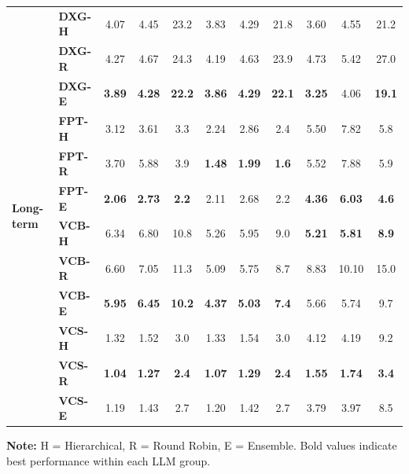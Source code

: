 \begin{table}[!h]
\begin{tabular}{llccc|ccc|ccc}
\multirow{12}{*}{\textbf{Long-term}}
& \textbf{DXG-H} & 4.07 & 4.45 & 23.2 & 3.83 & 4.29 & 21.8 & 3.60 & 4.55 & 21.2 \\
& \textbf{DXG-R} & 4.27 & 4.67 & 24.3 & 4.19 & 4.63 & 23.9 & 4.73 & 5.42 & 27.0 \\
& \textbf{DXG-E} & \textbf{3.89} & \textbf{4.28} & \textbf{22.2} & \textbf{3.86} & \textbf{4.29} & \textbf{22.1} & \textbf{3.25} & 4.06 & \textbf{19.1} \\
& \textbf{FPT-H} & 3.12 & 3.61 & 3.3 & 2.24 & 2.86 & 2.4 & 5.50 & 7.82 & 5.8 \\
& \textbf{FPT-R} & 3.70 & 5.88 & 3.9 & \textbf{1.48} & \textbf{1.99} & \textbf{1.6} & 5.52 & 7.88 & 5.9 \\
& \textbf{FPT-E} & \textbf{2.06} & \textbf{2.73} & \textbf{2.2} & 2.11 & 2.68 & 2.2 & \textbf{4.36} & \textbf{6.03} & \textbf{4.6} \\
& \textbf{VCB-H} & 6.34 & 6.80 & 10.8 & 5.26 & 5.95 & 9.0 & \textbf{5.21} & \textbf{5.81} & \textbf{8.9} \\
& \textbf{VCB-R} & 6.60 & 7.05 & 11.3 & 5.09 & 5.75 & 8.7 & 8.83 & 10.10 & 15.0 \\
& \textbf{VCB-E} & \textbf{5.95} & \textbf{6.45} & \textbf{10.2} & \textbf{4.37} & \textbf{5.03} & \textbf{7.4} & 5.66 & 5.74 & 9.7 \\
& \textbf{VCS-H} & 1.32 & 1.52 & 3.0 & 1.33 & 1.54 & 3.0 & 4.12 & 4.19 & 9.2 \\
& \textbf{VCS-R} & \textbf{1.04} & \textbf{1.27} & \textbf{2.4} & \textbf{1.07} & \textbf{1.29} & \textbf{2.4} & \textbf{1.55} & \textbf{1.74} & \textbf{3.4} \\
& \textbf{VCS-E} & 1.19 & 1.43 & 2.7 & 1.20 & 1.42 & 2.7 & 3.79 & 3.97 & 8.5 \\

\bottomrule
\end{tabular}

\vspace{0.2cm}
\footnotesize
\textbf{Note:} H = Hierarchical, R = Round Robin, E = Ensemble. Bold values indicate best performance within each LLM group.
\end{table}
